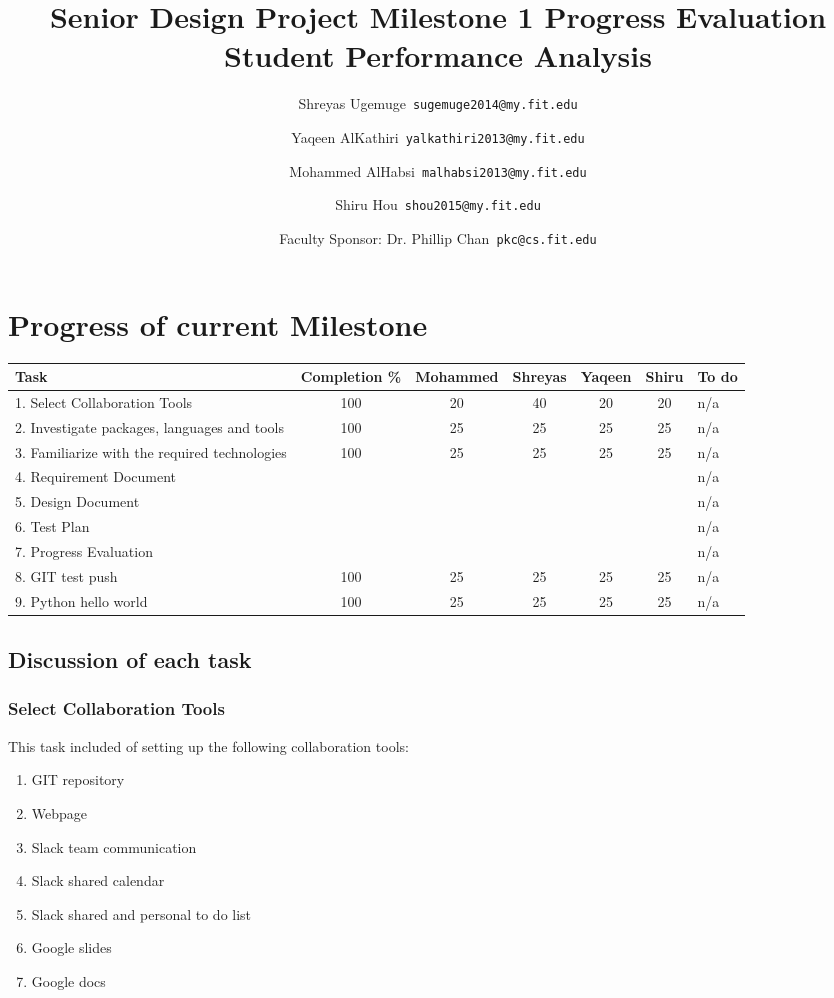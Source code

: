 \documentclass[11pt]{article}
\begin{document}
	\title{\textbf{Senior Design Project Milestone 1 Progress Evaluation} \\
	Student Performance Analysis}
	\author{Shreyas Ugemuge\      \texttt{sugemuge2014@my.fit.edu}
  \and
  Yaqeen AlKathiri\      \texttt{yalkathiri2013@my.fit.edu}
  \and
	Mohammed AlHabsi\      \texttt{malhabsi2013@my.fit.edu}
  \and
  Shiru Hou\      \texttt{shou2015@my.fit.edu}
  \and
  Faculty Sponsor: Dr. Phillip Chan\      \texttt{pkc@cs.fit.edu}}
	\maketitle
	\tableofcontents
	\pagebreak
	\section{Progress of current Milestone}
	\begin{tabularx}{\textwidth}{|X|c|c|c|c|c|X|}
	\hline
	\textbf{Task} & \textbf{Completion \%} & \textbf{Mohammed} & \textbf{Shreyas} & \textbf{Yaqeen} & \textbf{Shiru} & \textbf{To do} \\ \hline
	1. Select Collaboration Tools & 100 & 20 & 40 & 20 & 20 & n/a \\ \hline
	2. Investigate packages, languages and tools & 100 & 25 & 25 & 25 & 25 & n/a \\ \hline
	3. Familiarize with the required technologies & 100 & 25 & 25 & 25 & 25 & n/a \\ \hline
	4. Requirement Document & & & & & & n/a \\ \hline
	5. Design Document & & & & & & n/a \\ \hline
	6. Test Plan & & & & & & n/a \\ \hline
	7. Progress Evaluation & & & & & & n/a \\ \hline
	8. GIT test push & 100 & 25 & 25 & 25 & 25 & n/a \\ \hline
	9. Python hello world & 100 & 25 & 25 & 25 & 25 & n/a \\ \hline
	\end{tabularx}

	\subsection{Discussion of each task}
	\subsubsection{Select Collaboration Tools}
	This task included of setting up the following collaboration tools:
	\begin{enumerate}
		\item GIT repository
		\item Webpage
		\item Slack team communication
		\item Slack shared calendar
		\item Slack shared and personal to do list
		\item Google slides
		\item Google docs
	\end{enumerate}
\end{document}
